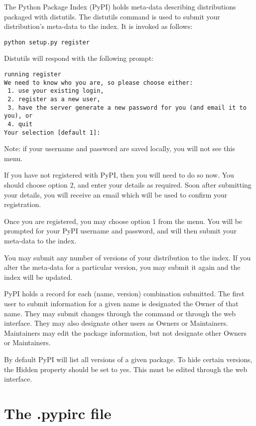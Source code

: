 \documentclass{manual}
\begin{document}
The Python Package Index (PyPI) holds meta-data describing distributions
packaged with distutils. The distutils command  is
used to submit your distribution's meta-data to the index. It is invoked
as follows:

\begin{verbatim}
python setup.py register
\end{verbatim}

Distutils will respond with the following prompt:

\begin{verbatim}
running register
We need to know who you are, so please choose either:
 1. use your existing login,
 2. register as a new user,
 3. have the server generate a new password for you (and email it to you), or
 4. quit
Your selection [default 1]:
\end{verbatim}

\noindent Note: if your username and password are saved locally, you will
not see this menu.

If you have not registered with PyPI, then you will need to do so now. You
should choose option 2, and enter your details as required. Soon after
submitting your details, you will receive an email which will be used to
confirm your registration.

Once you are registered, you may choose option 1 from the menu. You will
be prompted for your PyPI username and password, and 
will then submit your meta-data to the index.

You may submit any number of versions of your distribution to the index. If
you alter the meta-data for a particular version, you may submit it again
and the index will be updated.

PyPI holds a record for each (name, version) combination submitted. The
first user to submit information for a given name is designated the Owner
of that name. They may submit changes through the 
command or through the web interface. They may also designate other users
as Owners or Maintainers. Maintainers may edit the package information, but
not designate other Owners or Maintainers.

By default PyPI will list all versions of a given package. To hide certain
versions, the Hidden property should be set to yes. This must be edited
through the web interface.

\section{The .pypirc file}
\label{pypirc}
\end{document}
